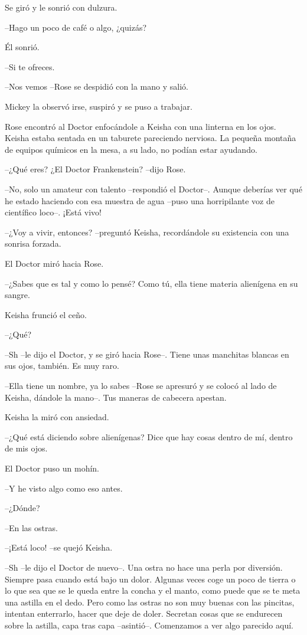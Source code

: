 {Se giró y le sonrió con dulzura.}

{--Hago un poco de café o algo, ¿quizás?}

{Él sonrió.}

{--Si te ofreces.}

{--Nos vemos --Rose se despidió con la mano y salió.}

{Mickey la observó irse, suspiró y se puso a trabajar.}

\mbox{}

{Rose encontró al Doctor enfocándole a Keisha con una linterna en los
 ojos. Keisha estaba sentada en un taburete pareciendo nerviosa. La
 pequeña montaña de equipos químicos en la mesa, a su lado, no podían
estar ayudando.}

{--¿Qué eres? ¿El Doctor Frankenstein? --dijo Rose.}

{--No, solo un amateur con talento --respondió el Doctor--. Aunque
 deberías ver qué he estado haciendo con esa muestra de agua --puso una
horripilante voz de científico loco--. ¡Está vivo!}

{--¿Voy a vivir, entonces? --preguntó Keisha, recordándole su existencia
con una sonrisa forzada.}

{El Doctor miró hacia Rose.}

{--¿Sabes que es tal y como lo pensé? Como tú, ella tiene materia
alienígena en su sangre.}

{Keisha frunció el ceño.}

{--¿Qué?}

{--Sh --le dijo el Doctor, y se giró hacia Rose--. Tiene unas manchitas
blancas en sus ojos, también. Es muy raro.}

{--Ella tiene un nombre, ya lo sabes --Rose se apresuró y se colocó al
lado de Keisha, dándole la mano--. Tus maneras de cabecera apestan.}

{Keisha la miró con ansiedad.}

{--¿Qué está diciendo sobre alienígenas? Dice que hay cosas dentro de
mí, dentro de mis ojos.}

{El Doctor puso un mohín.}

{--Y he visto algo como eso antes.}

{--¿Dónde?}

{--En las ostras.}

{--¡Está loco! --se quejó Keisha.}

{--Sh --le dijo el Doctor de nuevo--. Una ostra no hace una perla por
 diversión. Siempre pasa cuando está bajo un dolor. Algunas veces coge un
 poco de tierra o lo que sea que se le queda entre la concha y el manto,
 como puede que se te meta una astilla en el dedo. Pero como las ostras
 no son muy buenas con las pincitas, intentan enterrarlo, hacer que deje
 de doler. Secretan cosas que se endurecen sobre la astilla, capa tras
capa --asintió--. Comenzamos a ver algo parecido aquí.}

